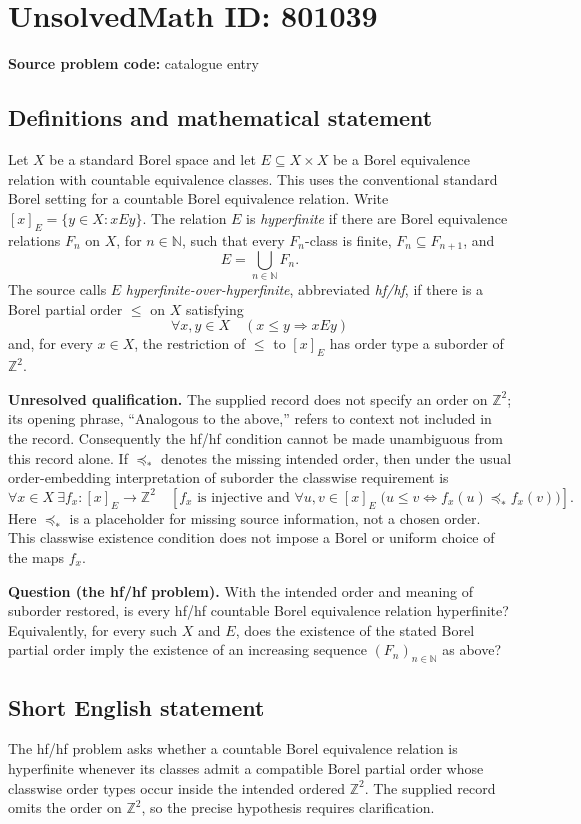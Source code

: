 \documentclass[11pt]{article}
\newcommand{\N}{\mathbb{N}}
\newcommand{\Z}{\mathbb{Z}}
\begin{document}
\section*{UnsolvedMath ID: 801039}
\textbf{Source problem code:} catalogue entry
\subsection{Definitions and mathematical statement}
Let \(X\) be a standard Borel space and let \(E\subseteq X\times X\) be a Borel equivalence relation with countable equivalence classes. This uses the conventional standard Borel setting for a countable Borel equivalence relation. Write \([x]_E=\{y\in X:xEy\}\). The relation \(E\) is \emph{hyperfinite} if there are Borel equivalence relations \(F_n\) on \(X\), for \(n\in\N\), such that every \(F_n\)-class is finite, \(F_n\subseteq F_{n+1}\), and
\[
E=\bigcup_{n\in\N}F_n.
\]
The source calls \(E\) \emph{hyperfinite-over-hyperfinite}, abbreviated \emph{hf/hf}, if there is a Borel partial order \(\leq\) on \(X\) satisfying
\[
\forall x,y\in X\quad (x\leq y\Longrightarrow xEy)
\]
and, for every \(x\in X\), the restriction of \(\leq\) to \([x]_E\) has order type a suborder of \(\Z^2\).

\textbf{Unresolved qualification.} The supplied record does not specify an order on \(\Z^2\); its opening phrase, ``Analogous to the above,'' refers to context not included in the record. Consequently the hf/hf condition cannot be made unambiguous from this record alone. If \(\preceq_*\) denotes the missing intended order, then under the usual order-embedding interpretation of suborder the classwise requirement is
\[
\forall x\in X\ \exists f_x:[x]_E\longrightarrow\Z^2\quad
\left[ f_x\text{ is injective and }\forall u,v\in[x]_E\;
\bigl(u\leq v\Longleftrightarrow f_x(u)\preceq_* f_x(v)\bigr)\right].
\]
Here \(\preceq_*\) is a placeholder for missing source information, not a chosen order. This classwise existence condition does not impose a Borel or uniform choice of the maps \(f_x\).

\textbf{Question (the hf/hf problem).} With the intended order and meaning of suborder restored, is every hf/hf countable Borel equivalence relation hyperfinite? Equivalently, for every such \(X\) and \(E\), does the existence of the stated Borel partial order imply the existence of an increasing sequence \((F_n)_{n\in\N}\) as above?
\subsection{Short English statement}
The hf/hf problem asks whether a countable Borel equivalence relation is hyperfinite whenever its classes admit a compatible Borel partial order whose classwise order types occur inside the intended ordered \(\Z^2\). The supplied record omits the order on \(\Z^2\), so the precise hypothesis requires clarification.
\end{document}
